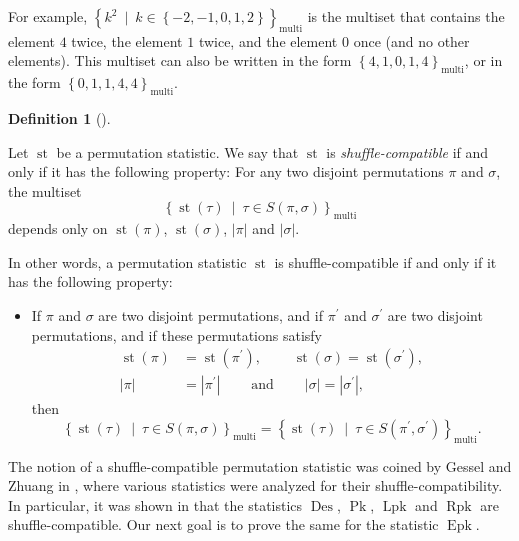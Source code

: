\documentclass[numbers=enddot,12pt,final,onecolumn,notitlepage]{scrartcl}%
\theoremstyle{definition}
\newtheorem{defi}[theo]{Definition}
\newenvironment{definition}[1][]
{\begin{defi}[#1]\begin{leftbar}}
{\end{leftbar}\end{defi}}
\begin{document}
For example, $\left\{  k^{2}\ \mid\ k\in\left\{  -2,-1,0,1,2\right\}
\right\}  _{\operatorname*{multi}}$ is the multiset that contains the element
$4$ twice, the element $1$ twice, and the element $0$ once (and no other
elements). This multiset can also be written in the form $\left\{
4,1,0,1,4\right\}  _{\operatorname*{multi}}$, or in the form $\left\{
0,1,1,4,4\right\}  _{\operatorname*{multi}}$.

\begin{definition}
Let $\operatorname*{st}$ be a permutation statistic. We say that
$\operatorname*{st}$ is \textit{shuffle-compatible} if and only if it has the
following property: For any two disjoint permutations $\pi$ and $\sigma$, the
multiset%
\[
\left\{  \operatorname*{st}\left(  \tau\right)  \ \mid\ \tau\in S\left(
\pi,\sigma\right)  \right\}  _{\operatorname*{multi}}%
\]
depends only on $\operatorname*{st}\left(  \pi\right)  $, $\operatorname*{st}%
\left(  \sigma\right)  $, $\left\vert \pi\right\vert $ and $\left\vert
\sigma\right\vert $.
\end{definition}

In other words, a permutation statistic $\operatorname*{st}$ is
shuffle-compatible if and only if it has the following property:

\begin{itemize}
\item If $\pi$ and $\sigma$ are two disjoint permutations, and if $\pi
^{\prime}$ and $\sigma^{\prime}$ are two disjoint permutations, and if these
permutations satisfy%
\begin{align*}
\operatorname*{st}\left(  \pi\right)   &  =\operatorname*{st}\left(
\pi^{\prime}\right)  ,\ \ \ \ \ \ \ \ \ \ \operatorname*{st}\left(
\sigma\right)  =\operatorname*{st}\left(  \sigma^{\prime}\right)  ,\\
\left\vert \pi\right\vert  &  =\left\vert \pi^{\prime}\right\vert
\ \ \ \ \ \ \ \ \ \ \text{and}\ \ \ \ \ \ \ \ \ \ \left\vert \sigma\right\vert
=\left\vert \sigma^{\prime}\right\vert ,
\end{align*}
then
\[
\left\{  \operatorname*{st}\left(  \tau\right)  \ \mid\ \tau\in S\left(
\pi,\sigma\right)  \right\}  _{\operatorname*{multi}}=\left\{
\operatorname*{st}\left(  \tau\right)  \ \mid\ \tau\in S\left(  \pi^{\prime
},\sigma^{\prime}\right)  \right\}  _{\operatorname*{multi}}.
\]

\end{itemize}

The notion of a shuffle-compatible permutation statistic was coined by Gessel
and Zhuang in \cite{part1}, where various statistics were analyzed for their
shuffle-compatibility. In particular, it was shown in \cite{part1} that the
statistics $\operatorname*{Des}$, $\operatorname*{Pk}$, $\operatorname*{Lpk}$
and $\operatorname*{Rpk}$ are shuffle-compatible. Our next goal is to prove
the same for the statistic $\operatorname*{Epk}$.
\end{document}
